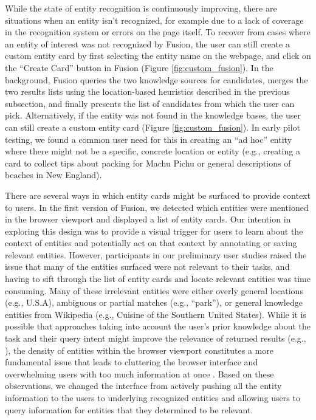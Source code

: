 While the state of entity recognition is continuously improving, there are situations when an entity isn't recognized, for example due to a lack of coverage in the recognition system or errors on the page itself. To recover from cases where an entity of interest was not recognized by Fusion, the user can still create a custom entity card by first selecting the entity name on the webpage, and click on the ``Create Card'' button in Fusion (Figure \ref{fig:custom_fusion}). In the background, Fusion queries the two knowledge sources for candidates, merges the two results lists using the location-based heuristics described in the previous subsection, and finally presents the list of candidates from which the user can pick.  Alternatively, if the entity was not found in the knowledge bases, the user can still create a custom entity card (Figure \ref{fig:custom_fusion}). In early pilot testing, we found a common user need for this in creating an ``ad hoc'' entity where there might not be a specific, concrete location or entity (e.g., creating a card to collect tips about packing for Machu Pichu or general descriptions of beaches in New England). 

There are several ways in which entity cards might be surfaced to provide context to users. In the first version of Fusion, we detected which entities were mentioned in the browser viewport and displayed a list of entity cards. Our intention in exploring this design was to provide a visual trigger for users to learn about the context of entities and potentially act on that context by annotating or saving relevant entities. However, participants in our preliminary user studies raised the issue that many of the entities surfaced were not relevant to their tasks, and having to sift through the list of entity cards and locate relevant entities was time consuming. Many of these irrelevant entities were either overly general locations (e.g., U.S.A), ambiguous or partial matches (e.g., ``park''), or general knowledge entities from Wikipedia (e.g., Cuisine of the Southern United States). While it is possible that approaches taking into account the user's prior knowledge about the task and their query intent might improve the relevance of returned results (e.g., \cite{pasupat2014zero}), the density of entities within the browser viewport constitutes a more fundamental issue that leads to cluttering the browser interface and overwhelming users with too much information at once \cite{wilson2008improving}. Based on these observations, we changed the interface from actively pushing all the entity information to the users to underlying recognized entities and allowing users to query information for entities that they determined to be relevant.

